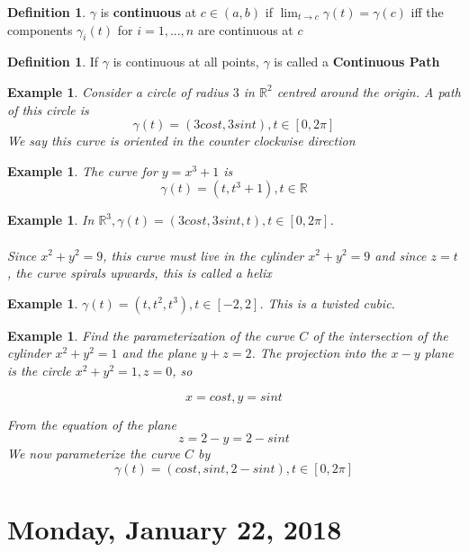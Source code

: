 \documentclass[12pt]{article}
\theoremstyle{plain}
\newtheorem{example}[theorem]{Example}
\theoremstyle{definition}
\newtheorem{definition}[theorem]{Definition}
\begin{document}
\begin{definition}
	$\gamma$ is \textbf{continuous} at $c\in (a,b)$ if $\lim_{t\to c} \gamma (t) = \gamma (c)$ iff the components $\gamma_i (t)$ for $i=1,...,n$ are continuous at $c$
\end{definition}

\begin{definition}
	If $\gamma$ is continuous at all points, $\gamma$ is called a \textbf{Continuous Path}
\end{definition}

\begin{example}
	Consider a circle of radius $3$ in $\mathbb{R}^2$ centred around the origin. A path of this circle is
	$$\gamma (t) = (3cost, 3sint), t \in [0,2\pi]$$
	We say this curve is oriented in the counter clockwise direction
\end{example}

\begin{example}
	The curve for $y=x^3 +1$ is
	$$\gamma (t) = (t, t^3 +1), t\in\mathbb{R}$$
\end{example}

\begin{example}
	In $\mathbb{R}^3, \gamma (t) = (3cost, 3sint, t) , t \in [0,2\pi]$.\\
	\\
	Since $x^2 + y^2 = 9$, this curve must live in the cylinder $x^2 + y^2 = 9$ and since $z=t$, the curve spirals upwards, this is called a helix
\end{example}

\begin{example}
	$\gamma (t)= (t, t^2, t^3), t\in [-2,2]$. This is a twisted cubic.
\end{example}

\begin{example}
	Find the parameterization of the curve $C$ of the intersection of the cylinder $x^2 + y^2 = 1$ and the plane $y+z = 2$. The projection into the $x-y$ plane is the circle $x^2 + y^2 = 1, z=0$, so

	$$x=cost, y=sint$$

	From the equation of the plane
	$$z = 2-y = 2-sint$$
	We now parameterize the curve $C$ by
	$$\gamma (t) = (cost, sint, 2-sint), t\in [0,2\pi]$$
\end{example}

\section{Monday, January 22, 2018}
\end{document}
